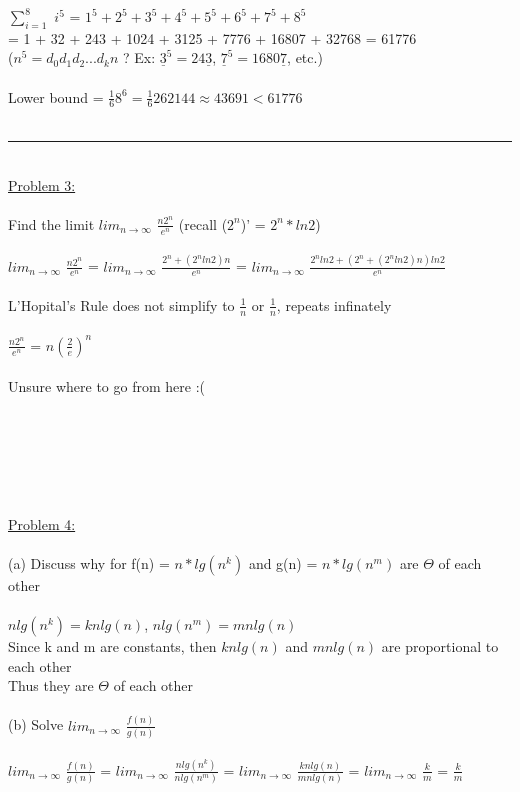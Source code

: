 \documentclass{article}
\begin{document}
    \indent $\sum_{i=1}^8$ $i^5$ = $1^5 + 2^5 + 3^5 + 4^5 + 5^5 + 6^5 + 7^5 + 8^5$\\
    \indent\hspace{1.36cm}= 1 + 32 + 243 + 1024 + 3125 + 7776 + 16807 + 32768 = 61776\\
    \indent\hspace{1.36cm}($n^5 = d_0d_1d_2...d_kn$ ? Ex: $\underline{3}^5 = 24\underline{3}$, $\underline{7}^5 = 1680\underline{7}$, etc.)\\\\
    \indent Lower bound = $\frac{1}{6}8^6 = \frac{1}{6}262144 \approx 43691 < 61776$\\
    \\
    \rule{\textwidth}{0.5pt}\\
    \underline{Problem 3:}\\\\
    Find the limit $lim_{n\rightarrow\infty}$ $\frac{n2^n}{e^n}$ (recall ($2^n$)' = $2^n*ln2$)\\
    \\
    \indent $lim_{n\rightarrow\infty}$ $\frac{n2^n}{e^n}$ = $lim_{n\rightarrow\infty}$ $\frac{2^n + (2^nln2)n}{e^n}$ = $lim_{n\rightarrow\infty}$ $\frac{2^nln2 + (2^n + (2^nln2)n)ln2}{e^n}$\\\\
    \indent L'Hopital's Rule does not simplify to $\frac{1}{n}$ or $\frac{1}{n}$, repeats infinately\\\\
    \indent $\frac{n2^n}{e^n}$ = $n(\frac{2}{e})^n$ \\\\
    \indent Unsure where to go from here :(\\\\\\\\\\\\
    \\
    \underline{Problem 4:}\\\\
    (a) Discuss why for f(n) = $n*lg(n^k)$ and g(n) = $n*lg(n^m)$ are $\Theta$ of each other\\
    \\
    \indent $nlg(n^k) = knlg(n)$, $nlg(n^m) = mnlg(n)$\\
    \indent Since k and m are constants, then $knlg(n)$ and $mnlg(n)$ are proportional to each other\\
    \indent Thus they are $\Theta$ of each other\\
    \\
    (b) Solve $lim_{n\rightarrow\infty}$ $\frac{f(n)}{g(n)}$\\
    \\
    \indent $lim_{n\rightarrow\infty}$ $\frac{f(n)}{g(n)}$ = $lim_{n\rightarrow\infty}$ $\frac{nlg(n^k)}{nlg(n^m)}$ = $lim_{n\rightarrow\infty}$ $\frac{knlg(n)}{mnlg(n)}$ = $lim_{n\rightarrow\infty}$ $\frac{k}{m}$ = $\frac{k}{m}$\\
    \\
\end{document}
